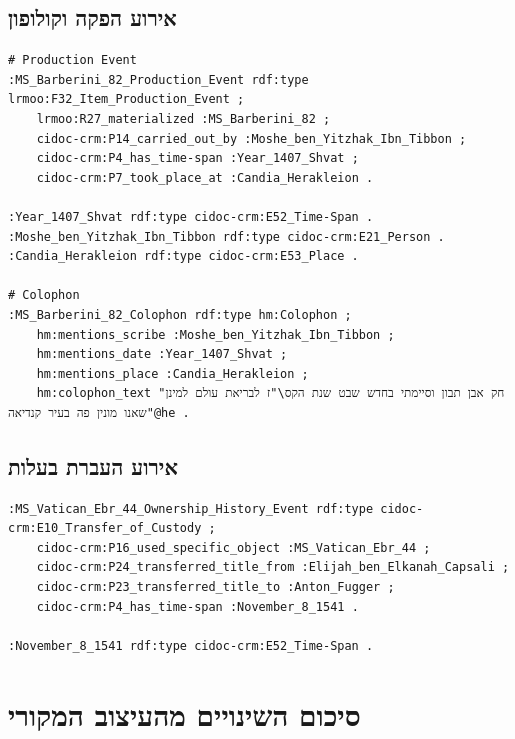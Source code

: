 \subsection{אירוע הפקה וקולופון}

\begin{LTR}
\begin{verbatim}
# Production Event
:MS_Barberini_82_Production_Event rdf:type lrmoo:F32_Item_Production_Event ;
    lrmoo:R27_materialized :MS_Barberini_82 ;
    cidoc-crm:P14_carried_out_by :Moshe_ben_Yitzhak_Ibn_Tibbon ;
    cidoc-crm:P4_has_time-span :Year_1407_Shvat ;
    cidoc-crm:P7_took_place_at :Candia_Herakleion .

:Year_1407_Shvat rdf:type cidoc-crm:E52_Time-Span .
:Moshe_ben_Yitzhak_Ibn_Tibbon rdf:type cidoc-crm:E21_Person .
:Candia_Herakleion rdf:type cidoc-crm:E53_Place .

# Colophon
:MS_Barberini_82_Colophon rdf:type hm:Colophon ;
    hm:mentions_scribe :Moshe_ben_Yitzhak_Ibn_Tibbon ;
    hm:mentions_date :Year_1407_Shvat ;
    hm:mentions_place :Candia_Herakleion ;
    hm:colophon_text "חק אבן תבון וסיימתי בחדש שבט שנת הקס\"ז לבריאת עולם למינן שאנו מונין פה בעיר קנדיאה"@he .
\end{verbatim}
\end{LTR}

\subsection{אירוע העברת בעלות}

\begin{LTR}
\begin{verbatim}
:MS_Vatican_Ebr_44_Ownership_History_Event rdf:type cidoc-crm:E10_Transfer_of_Custody ;
    cidoc-crm:P16_used_specific_object :MS_Vatican_Ebr_44 ;
    cidoc-crm:P24_transferred_title_from :Elijah_ben_Elkanah_Capsali ;
    cidoc-crm:P23_transferred_title_to :Anton_Fugger ;
    cidoc-crm:P4_has_time-span :November_8_1541 .

:November_8_1541 rdf:type cidoc-crm:E52_Time-Span .
\end{verbatim}
\end{LTR}

\newpage

\section{סיכום השינויים מהעיצוב המקורי}

